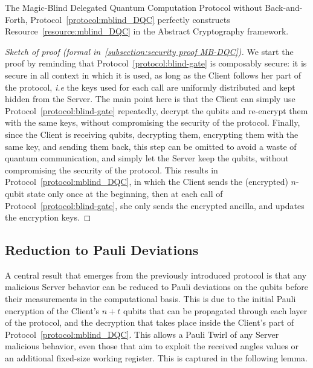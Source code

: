 \begin{theorem}
    \label{thm:mblind_DQC-noBF}
    The Magic-Blind Delegated Quantum Computation Protocol without Back-and-Forth, Protocol~\ref{protocol:mblind_DQC} perfectly constructs Resource~\ref{resource:mblind_DQC} in the Abstract Cryptography framework.
    \end{theorem}

\begin{proof}[Sketch of proof (formal in~\ref{subsection:security proof MB-DQC})]
    We start the proof by reminding that Protocol~\ref{protocol:blind-gate} is composably secure: it is secure in all context in which it is used, as long as the Client follows her part of the protocol, \textit{i.e} the keys used for each call are uniformly distributed and kept hidden from the Server.
    The main point here is that the Client can simply use Protocol~\ref{protocol:blind-gate} repeatedly, decrypt the qubits and re-encrypt them with the same keys, without compromising the security of the protocol. Finally, since the Client is receiving qubits, decrypting them, encrypting them with the same key, and sending them back, this step can be omitted to avoid a waste of quantum communication, and simply let the Server keep the qubits, without compromising the security of the protocol. This results in Protocol~\ref{protocol:mblind_DQC}, in which the Client sends the (encrypted) $n$-qubit state only once at the beginning, then at each call of Protocol~\ref{protocol:blind-gate}, she only sends the encrypted ancilla, and updates the encryption keys.
\end{proof}

\subsection{Reduction to Pauli Deviations}
\label{subsection:blind:Pauli dev}
A central result that emerges from the previously introduced protocol is that any malicious Server behavior can be reduced to Pauli deviations on the qubits before their measurements in the computational basis. This is due to the initial Pauli encryption of the Client's $n+t$ qubits that can be propagated through  each layer of the protocol, and the decryption that takes place inside the Client's part of Protocol~\ref{protocol:mblind_DQC}.
This allows a Pauli Twirl of any Server malicious behavior, even those that aim to exploit the received angles values or an additional fixed-size working register. This is captured in the following lemma.

